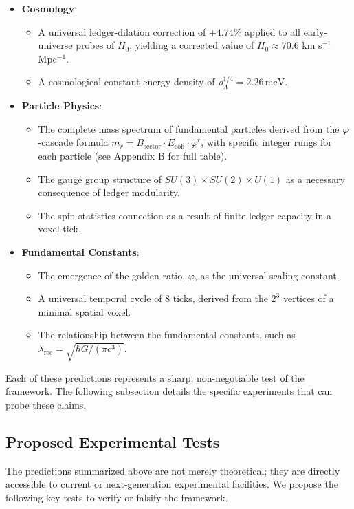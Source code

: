 \documentclass[11pt,a4paper]{article}
\begin{document}
\begin{itemize}
    \item \textbf{Cosmology}:
    \begin{itemize}
        \item A universal ledger-dilation correction of \(+4.74\%\) applied to all early-universe probes of \(H_0\), yielding a corrected value of \(H_0 \approx 70.6\) km s\(^{-1}\) Mpc\(^{-1}\).
        \item A cosmological constant energy density of \(\rho_\Lambda^{1/4} = 2.26\,\mathrm{meV}\).
    \end{itemize}

    \item \textbf{Particle Physics}:
    \begin{itemize}
        \item The complete mass spectrum of fundamental particles derived from the \(\varphi\)-cascade formula \(m_r = B_{\text{sector}} \cdot E_{\text{coh}} \cdot \varphi^r\), with specific integer rungs for each particle (see Appendix B for full table).
        \item The gauge group structure of \(SU(3) \times SU(2) \times U(1)\) as a necessary consequence of ledger modularity.
        \item The spin-statistics connection as a result of finite ledger capacity in a voxel-tick.
    \end{itemize}

    \item \textbf{Fundamental Constants}:
    \begin{itemize}
        \item The emergence of the golden ratio, \(\varphi\), as the universal scaling constant.
        \item A universal temporal cycle of 8 ticks, derived from the \(2^3\) vertices of a minimal spatial voxel.
        \item The relationship between the fundamental constants, such as \(\lambda_{\text{rec}} = \sqrt{\hbar G / (\pi c^3)}\).
    \end{itemize}
\end{itemize}
Each of these predictions represents a sharp, non-negotiable test of the framework. The following subsection details the specific experiments that can probe these claims.

\subsection{Proposed Experimental Tests}
The predictions summarized above are not merely theoretical; they are directly accessible to current or next-generation experimental facilities. We propose the following key tests to verify or falsify the framework.
\end{document}
